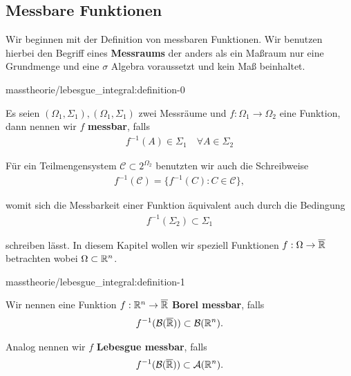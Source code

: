 \subsection{Messbare Funktionen}
\label{\detokenize{masstheorie/lebesgue_integral:messbare-funktionen}}
\par
Wir beginnen mit der Definition von messbaren Funktionen. Wir benutzen hierbei den Begriff eines \textbf{Messraums} der anders als ein Maßraum nur eine Grundmenge und eine \(\sigma\) Algebra voraussetzt und kein Maß beinhaltet.
\begin{definition}{}{masstheorie/lebesgue_integral:definition-0}



\par
Es seien \((\Omega_1,\Sigma_1), (\Omega_1,\Sigma_1)\) zwei Messräume und \(f:\Omega_1\to\Omega_2\) eine Funktion, dann nennen wir \(f\) \textbf{messbar}, falls
\begin{align*}
f^{-1}(A)\in\Sigma_1\quad\forall A\in\Sigma_2
\end{align*}\end{definition}

\par
Für ein Teilmengensystem \(\mathcal{C}\subset 2^{\Omega_2}\) benutzten wir auch die Schreibweise
\begin{align*}
f^{-1}(\mathcal{C}) = \{ f^{-1}(C): C\in\mathcal{C}\},
\end{align*}
\par
womit sich die Messbarkeit einer Funktion äquivalent auch durch die Bedingung
\begin{align*}
f^{-1}(\Sigma_2)\subset\Sigma_1
\end{align*}
\par
schreiben lässt. In diesem Kapitel wollen wir speziell Funktionen \(f:\Omega\to\overline{\mathbb{R}}\) betrachten wobei \(\Omega\subset\mathbb{R}^n\).
\begin{definition}{}{masstheorie/lebesgue_integral:definition-1}



\par
Wir nennen eine Funktion \(f:\mathbb{R}^n\to\overline{\mathbb{R}}\) \textbf{Borel messbar}, falls
\begin{align*}
f^{-1}(\mathcal{B}(\overline{\mathbb{R}}))\subset \mathcal{B}(\mathbb{R}^n).
\end{align*}
\par
Analog nennen wir \(f\) \textbf{Lebesgue messbar}, falls
\begin{align*}
f^{-1}(\mathcal{B}(\overline{\mathbb{R}}))\subset \mathcal{A}(\mathbb{R}^n).
\end{align*}\end{definition}

